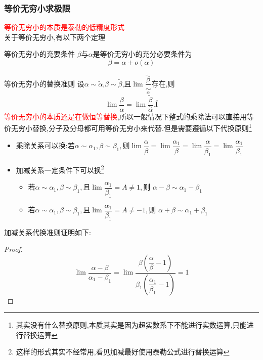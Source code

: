 \documentclass[9pt a4paper, oneside, UTF8]{ctexbook}
\begin{document}
\begin{sloppypar}
    \subsubsection{等价无穷小求极限}
    \textcolor{red}{等价无穷小的本质是泰勒的低精度形式}\\
    关于等价无穷小,有以下两个定理
    \begin{defn}{等价无穷小的充要条件}{}
        $\beta$与$\alpha$是等价无穷小的充分必要条件为
        $$
            \beta=\alpha + o(\alpha)
        $$
    \end{defn}
    \begin{defn}{等价无穷小的替换准则}{}
        设$\alpha\sim\widetilde{\alpha}$,$\beta\sim\widetilde{\beta}$,且$\lim\dfrac{\widetilde{\beta}}{\underset{\alpha}{\operatorname*{\sim}}}$存在,则
        $$
            \lim\dfrac{\beta}{\alpha}=\lim\dfrac{\widetilde{\beta}}{\overset{\sim}{\alpha}}.Í
        $$
        \textcolor{red}{等价无穷小的本质还是在做恒等替换},所以一般情况下整式的乘除法可以直接用等价无穷小替换,分子及分母都可用等价无穷小来代替.但是需要遵循以下代换原则\footnote{其实没有什么替换原则,本质其实是因为超实数系下不能进行实数运算,只能进行替换运算}
        \begin{itemize}
            \item 乘除关系可以换:若$\alpha\sim\alpha_1,\beta\sim\beta_1,\text{则}\lim\dfrac\alpha\beta=\lim\dfrac{\alpha_1}\beta=\lim\dfrac\alpha{\beta_1}=\lim\dfrac{\alpha_1}{\beta_1}$
            \item 加减关系一定条件下可以换\footnote{这样的形式其实不经常用,看见加减最好使用泰勒公式进行替换运算}
                  \begin{itemize}
                      \item 若$\alpha\sim\alpha_{1},\beta\sim\beta_{1},\text{且}\operatorname*{lim}\dfrac{\alpha_{1}}{\beta_{1}}=A\neq1,\text{则 }\alpha-\beta\sim\alpha_{1}-\beta_{1}$
                      \item 若$\alpha\sim\alpha_{1},\beta\sim\beta_{1},\text{且}\operatorname*{lim}\dfrac{\alpha_{1}}{\beta_{1}}=A\neq-1,\text{则 }\alpha+\beta\sim\alpha_{1}+\beta_{1}$
                  \end{itemize}
        \end{itemize}
        加减关系代换准则证明如下:
        \begin{proof}
            $$\lim \dfrac{\alpha-\beta}{\alpha_1 -\beta_1}=\lim \dfrac{\beta (\dfrac{\alpha}{\beta}-1)}{\beta_1(\dfrac{\alpha_1}{\beta_1}-1)}=1$$
        \end{proof}
    \end{defn}

\end{sloppypar}
\end{document}
